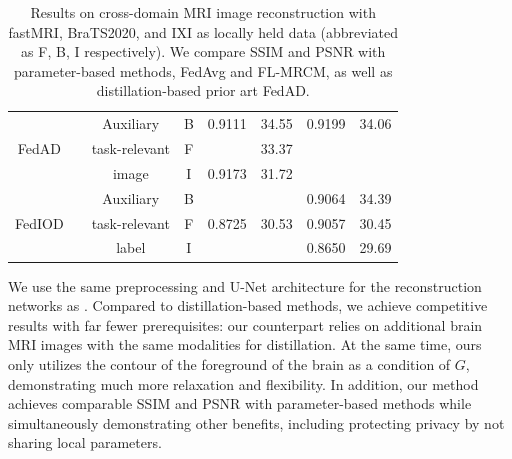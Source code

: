 \documentclass[letterpaper]{article} %
\newcommand{\cmark}{\ding{51}}%
\begin{document}
\begin{table}
{\begin{tabular}{cccc|cc|cc}
\multirow{3}{*}{FedAD}
&\multirow{3}{*}{\cmark} %
&Auxiliary &\cellcolor{gray0}B &\cellcolor{gray0}0.9111 &\cellcolor{gray0}34.55 
&\cellcolor{gray0}0.9199 &\cellcolor{gray0}34.06  
\\
& &task-relevant  &\cellcolor{gray1}F &\cellcolor{gray1}{0.9182} &\cellcolor{gray1}33.37 &\cellcolor{gray1}{0.9374} &\cellcolor{gray1}{32.76}\\
& &image  &\cellcolor{gray2}I &\cellcolor{gray2}0.9173 &\cellcolor{gray2}31.72  &\cellcolor{gray2}{0.9058} &\cellcolor{gray2}{30.93}\\
\midrule
\multirow{3}{*}{FedIOD} 
&\multirow{3}{*}{\cmark} 
&Auxiliary &\cellcolor{gray0}B 
&\cellcolor{gray0}{0.9326}  &\cellcolor{gray0}{36.08} 
&\cellcolor{gray0}0.9064 &\cellcolor{gray0}34.39  
\\
& &task-relevant  &\cellcolor{gray1}F &\cellcolor{gray1}0.8725 &\cellcolor{gray1}30.53 &\cellcolor{gray1}0.9057 &\cellcolor{gray1}30.45  \\
& &label  &\cellcolor{gray2}I &\cellcolor{gray2}{0.9198} &\cellcolor{gray2}{32.15} &\cellcolor{gray2}0.8650 &\cellcolor{gray2}29.69 \\
\bottomrule
\end{tabular}}
\caption{Results on cross-domain MRI image reconstruction with fastMRI, BraTS2020, and IXI as locally held data (abbreviated as F, B, I respectively). We compare SSIM and PSNR with parameter-based methods, FedAvg and FL-MRCM,  as well as distillation-based prior art FedAD.
}
\label{tab:mriin}
\end{table}

We use the same preprocessing and U-Net \cite{ronneberger2015u} architecture for the reconstruction networks as \cite{Guo_2021_CVPR, gong2022federated}. %
Compared to distillation-based methods, we achieve competitive results 
with far fewer prerequisites: our counterpart \cite{gong2022federated} relies on additional brain MRI images with the same modalities for distillation. At the same time, ours only utilizes the contour of the foreground of the brain as a condition of $G$, demonstrating much more relaxation and flexibility.  In addition, our method achieves comparable SSIM and PSNR with parameter-based methods while simultaneously demonstrating other benefits, including protecting privacy by not sharing local parameters.
\end{document}
